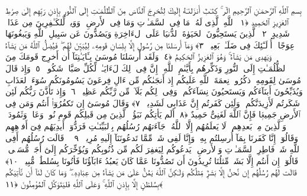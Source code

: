 
  
    
  
    
    

\nopagebreak
  بِسمِ ٱللَّهِ ٱلرَّحمَـٰنِ ٱلرَّحِيمِ
  الٓر ۚ كِتَـٰبٌ أَنزَلنَـٰهُ إِلَيكَ لِتُخرِجَ ٱلنَّاسَ مِنَ ٱلظُّلُمَـٰتِ إِلَى ٱلنُّورِ بِإِذنِ رَبِّهِم إِلَىٰ صِرَٰطِ ٱلعَزِيزِ ٱلحَمِيدِ ﴿١﴾
 ٱللَّهِ ٱلَّذِى لَهُۥ مَا فِى ٱلسَّمَـٰوَٟتِ وَمَا فِى ٱلأَرضِ ۗ وَوَيلٌۭ لِّلكَـٰفِرِينَ مِن عَذَابٍۢ شَدِيدٍ ﴿٢﴾
 ٱلَّذِينَ يَستَحِبُّونَ ٱلحَيَوٰةَ ٱلدُّنيَا عَلَى ٱلءَاخِرَةِ وَيَصُدُّونَ عَن سَبِيلِ ٱللَّهِ وَيَبغُونَهَا عِوَجًا ۚ أُو۟لَـٰٓئِكَ فِى ضَلَـٰلٍۭ بَعِيدٍۢ ﴿٣﴾
 وَمَآ أَرسَلنَا مِن رَّسُولٍ إِلَّا بِلِسَانِ قَومِهِۦ لِيُبَيِّنَ لَهُم ۖ فَيُضِلُّ ٱللَّهُ مَن يَشَآءُ وَيَهدِى مَن يَشَآءُ ۚ وَهُوَ ٱلعَزِيزُ ٱلحَكِيمُ ﴿٤﴾
 وَلَقَد أَرسَلنَا مُوسَىٰ بِـَٔايَـٰتِنَآ أَن أَخرِج قَومَكَ مِنَ ٱلظُّلُمَـٰتِ إِلَى ٱلنُّورِ وَذَكِّرهُم بِأَيَّىٰمِ ٱللَّهِ ۚ إِنَّ فِى ذَٟلِكَ لَءَايَـٰتٍۢ لِّكُلِّ صَبَّارٍۢ شَكُورٍۢ ﴿٥﴾
 وَإِذ قَالَ مُوسَىٰ لِقَومِهِ ٱذكُرُوا۟ نِعمَةَ ٱللَّهِ عَلَيكُم إِذ أَنجَىٰكُم مِّن ءَالِ فِرعَونَ يَسُومُونَكُم سُوٓءَ ٱلعَذَابِ وَيُذَبِّحُونَ أَبنَآءَكُم وَيَستَحيُونَ نِسَآءَكُم ۚ وَفِى ذَٟلِكُم بَلَآءٌۭ مِّن رَّبِّكُم عَظِيمٌۭ ﴿٦﴾
 وَإِذ تَأَذَّنَ رَبُّكُم لَئِن شَكَرتُم لَأَزِيدَنَّكُم ۖ وَلَئِن كَفَرتُم إِنَّ عَذَابِى لَشَدِيدٌۭ ﴿٧﴾
 وَقَالَ مُوسَىٰٓ إِن تَكفُرُوٓا۟ أَنتُم وَمَن فِى ٱلأَرضِ جَمِيعًۭا فَإِنَّ ٱللَّهَ لَغَنِىٌّ حَمِيدٌ ﴿٨﴾
 أَلَم يَأتِكُم نَبَؤُا۟ ٱلَّذِينَ مِن قَبلِكُم قَومِ نُوحٍۢ وَعَادٍۢ وَثَمُودَ ۛ وَٱلَّذِينَ مِنۢ بَعدِهِم ۛ لَا يَعلَمُهُم إِلَّا ٱللَّهُ ۚ جَآءَتهُم رُسُلُهُم بِٱلبَيِّنَـٰتِ فَرَدُّوٓا۟ أَيدِيَهُم فِىٓ أَفوَٟهِهِم وَقَالُوٓا۟ إِنَّا كَفَرنَا بِمَآ أُرسِلتُم بِهِۦ وَإِنَّا لَفِى شَكٍّۢ مِّمَّا تَدعُونَنَآ إِلَيهِ مُرِيبٍۢ ﴿٩﴾
 ۞ قَالَت رُسُلُهُم أَفِى ٱللَّهِ شَكٌّۭ فَاطِرِ ٱلسَّمَـٰوَٟتِ وَٱلأَرضِ ۖ يَدعُوكُم لِيَغفِرَ لَكُم مِّن ذُنُوبِكُم وَيُؤَخِّرَكُم إِلَىٰٓ أَجَلٍۢ مُّسَمًّۭى ۚ قَالُوٓا۟ إِن أَنتُم إِلَّا بَشَرٌۭ مِّثلُنَا تُرِيدُونَ أَن تَصُدُّونَا عَمَّا كَانَ يَعبُدُ ءَابَآؤُنَا فَأتُونَا بِسُلطَٰنٍۢ مُّبِينٍۢ ﴿١٠﴾
 قَالَت لَهُم رُسُلُهُم إِن نَّحنُ إِلَّا بَشَرٌۭ مِّثلُكُم وَلَـٰكِنَّ ٱللَّهَ يَمُنُّ عَلَىٰ مَن يَشَآءُ مِن عِبَادِهِۦ ۖ وَمَا كَانَ لَنَآ أَن نَّأتِيَكُم بِسُلطَٰنٍ إِلَّا بِإِذنِ ٱللَّهِ ۚ وَعَلَى ٱللَّهِ فَليَتَوَكَّلِ ٱلمُؤمِنُونَ ﴿١١﴾
